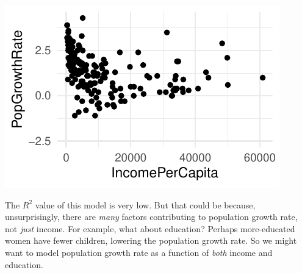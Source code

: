 \documentclass[twoside]{book}\usepackage[]{graphicx}\usepackage[]{xcolor}
\makeatletter
\def\maxwidth{ %
  \ifdim\Gin@nat@width>\linewidth
    \linewidth
  \else
    \Gin@nat@width
  \fi
}
\newenvironment{knitrout}{}{} %
\newcounter{example}[section]
\makeatother
\begin{document}
\begin{knitrout}
{\centering \includegraphics[width=\maxwidth]{figures/fig-who-slm-1} 

}



\end{knitrout}

The $R^2$ value of this model is very low. But that could be because, unsurprisingly, there are \emph{many} factors contributing to population growth rate, not \emph{just} income.  For example, what about education? Perhaps more-educated women have fewer children, lowering the population growth rate.  So we might want to model population growth rate as a function of \emph{both} income and education.
\end{document}
